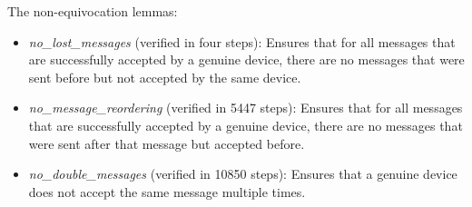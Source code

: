 The non-equivocation lemmas:
\begin{itemize}

\item \emph{no\_lost\_messages} (verified in four steps): Ensures that for all messages that are successfully accepted by a genuine \projecttitle{} device, there are no messages that were sent before but not accepted by the same \projecttitle{} device.
\item \emph{no\_message\_reordering} (verified in 5447 steps): Ensures that for all messages that are successfully accepted by a genuine \projecttitle{} device, there are no messages that were sent after that message but accepted before.
\item \emph{no\_double\_messages} (verified in 10850 steps): Ensures that a genuine \projecttitle{} device does not accept the same message multiple times.

\end{itemize}











